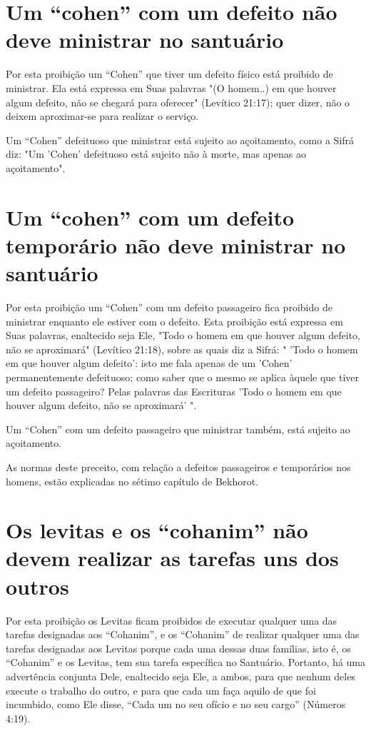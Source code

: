 \section{Um ``cohen'' com um defeito não deve ministrar no santuário}

Por esta proibição um ``Cohen'' que tiver um defeito físico está proi­bido
de ministrar. Ela está expressa em Suas palavras "(O homem..) em que
hou­ver algum defeito, não se chegará para oferecer" (Levítico 21:17);
quer dizer, não o deixem aproximar-se para realizar o serviço.

Um ``Cohen'' defeituoso que ministrar está sujeito ao açoitamento, como a
Sifrá diz: "Um 'Cohen' defeituoso está sujeito não à morte, mas apenas
ao açoitamento".

\section{Um ``cohen'' com um defeito temporário não deve ministrar no santuário}

Por esta proibição um ``Cohen'' com um defeito passageiro fica proi­bido
de ministrar enquanto ele estiver com o defeito. Esta proibição está
expressa em Suas palavras, enaltecido seja Ele, "Todo o homem em que
houver algum defeito, não se aproximará" (Levítico 21:18), sobre as
quais diz a Sifrá: " 'Todo o homem em que houver algum defeito': isto me
fala apenas de um 'Cohen'
permanentemente defeituoso; como saber que o mesmo se aplica àquele que
tiver um defeito passageiro? Pelas palavras das Escrituras 'Todo o homem
em que houver algum defeito, não se aproximará' ".

Um ``Cohen'' com um defeito passageiro que ministrar também, es­tá sujeito
ao açoitamento.

As normas deste preceito, com relação a defeitos passageiros e
tem­porários nos homens, estão explicadas no sétimo capítulo de
Bekhorot.

\section{Os levitas e os ``cohanim'' não devem realizar as tarefas uns dos outros}

Por esta proibição os Levitas ficam proibidos de executar qualquer uma
das tarefas designadas aos ``Cohanim'', e os ``Cohanim'' de realizar
qual­quer uma das tarefas designadas aos Levitas porque cada uma dessas
duas famí­lias, isto é, os ``Cohanim'' e os Levitas, tem sua tarefa
específica no Santuário. Portanto, há uma advertência conjunta Dele,
enaltecido seja Ele, a ambos, para que nenhum deles execute o trabalho
do outro, e para que cada um faça aquilo de que foi incumbido, como Ele
disse, ``Cada um no seu ofício e no seu cargo'' (Números 4:19).

